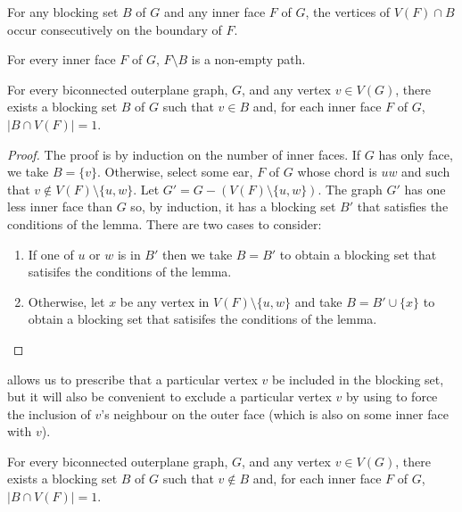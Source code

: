 \documentclass{patmorin}
\begin{document}
\begin{obs}
   For any blocking set $B$ of $G$ and any inner face $F$ of $G$, the
   vertices of $V(F)\cap B$ occur consecutively on the boundary of $F$.
\end{obs}

\begin{obs}
  For every inner face $F$ of $G$, $F \setminus B$ is a non-empty path.
\end{obs}


\begin{lem}
  For every biconnected outerplane graph, $G$, and any vertex $v\in
  V(G)$, there exists a blocking set $B$ of $G$ such that $v\in B$ and,
  for each inner face $F$ of $G$, $|B\cap V(F)|=1$.
\end{lem}

\begin{proof}
  The proof is by induction on the number of inner faces.  If $G$ has
  only face, we take $B=\{v\}$.  Otherwise, select some ear, $F$ of $G$
  whose chord is $uw$ and such that $v\not\in V(F)\setminus\{u,w\}$.
  Let $G'=G-(V(F)\setminus\{u,w\})$.  The graph $G'$ has one less inner
  face than $G$ so, by induction, it has a blocking set $B'$ that satisfies
  the conditions of the lemma.  There are two cases to consider:
  \begin{enumerate}
    \item If one of $u$ or $w$ is in $B'$ then we take $B=B'$ to obtain
      a blocking set that satisifes the conditions of the lemma.

    \item Otherwise, let $x$ be any vertex in $V(F)\setminus\{u,w\}$ and
      take $B=B'\cup\{x\}$ to obtain a blocking set that satisifes the
      conditions of the lemma. \qedhere
  \end{enumerate}
\end{proof}

 allows us to prescribe that a particular vertex
$v$ be included in the blocking set, but it will also be convenient to
exclude a particular vertex $v$ by using  to force
the inclusion of $v$'s neighbour on the outer face (which is also on
some inner face with $v$).

\begin{cor}
  For every biconnected outerplane graph, $G$, and any vertex $v\in
  V(G)$, there exists a blocking set $B$ of $G$ such that $v\not\in B$ and,
  for each inner face $F$ of $G$, $|B\cap V(F)|=1$.
\end{cor}
\end{document}
